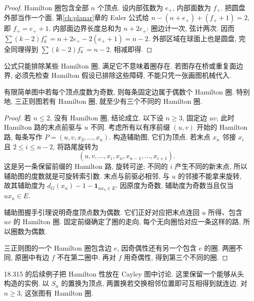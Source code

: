 \begin{proof}
Hamilton 圈包含全部 $n$ 个顶点. 设内部弦数为 $e_+$, 内部面数为 $f_+$. 把圆盘外部当作一个面, 第\ref{ch:planar}章的 Euler 公式给 $n-(n+e_+)+(f_++1)=2$, 即 $f_+=e_++1$. 内部面边界长度总和为 $n+2e_+$: 圈边计一次, 弦计两次. 因而 $\sum(k-2)f_k^+=n+2e_+-2(e_++1)=n-2$. 外部区域在球面上也是圆盘, 完全同理得到 $\sum(k-2)f_k^-=n-2$. 相减即得.
\end{proof}
公式只能排除某些 Hamilton 圈, 满足它不意味着圈存在. 若图存在桥或重复面边界, 必须先检查 Hamilton 假设已排除这些障碍, 不能只凭一张画图机械代入.
\begin{theorem}[奇度图的奇偶性]\label{thm:smith}
有限简单图中若每个顶点度数为奇数, 则每条固定边属于偶数个 Hamilton 圈. 特别地, 三正则图若有 Hamilton 圈, 就至少有三个不同的 Hamilton 圈.
\end{theorem}
\begin{proof}
若 $n\le2$, 没有 Hamilton 圈, 结论成立. 以下设 $n\ge3$, 固定边 $uv$, 此时 Hamilton 路的末点前驱与 $u$ 不同. 考虑所有以有序前缀 $(u,v)$ 开始的 Hamilton 路, 每条写作 $P=(u,v,x_3,\ldots,x_n)$. 构造辅助图, 它们为顶点. 若末点 $x_n$ 邻接 $x_i$ 且 $2\le i\le n-2$, 将路尾旋转为
\[
(u,v,\ldots,x_i,x_n,x_{n-1},\ldots,x_{i+1}).
\]
这是另一条保留前缀的 Hamilton 路, 旋转可逆; 不同的 $i$ 产生不同的新末点, 所以辅助图的度数就是可旋转索引数. 末点与前驱必相邻, 与 $u$ 的邻接不能拿来旋转, 故其辅助度为 $d_G(x_n)-1-\mathbf1_{ux_n\in E}$. 因原度为奇数, 辅助度为奇数当且仅当 $ux_n\in E$.

辅助图握手引理说明奇度顶点数为偶数. 它们正好对应把末点连回 $u$ 所得、包含 $uv$ 的 Hamilton 圈. 固定前缀确定了圈的走向, 每个无向圈恰对应一条这样的路, 所以圈数为偶数.

三正则图的一个 Hamilton 圈包含边 $e$, 因奇偶性还有另一个包含 $e$ 的圈. 两圈不同, 原圈中有边 $f$ 不在第二圈中. 再对 $f$ 用奇偶性, 得到第三个不同的圈.
\end{proof}
18.315 的后续例子把 Hamilton 性放在 Cayley 图中讨论. 这里保留一个能够从头构造的实例. 以 $S_n$ 的置换为顶点, 两置换若交换相邻位置即可互相得到就连边. 对 $n\ge3$, 这张图有 Hamilton 圈.

